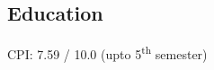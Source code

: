 \documentclass[]{deedy}
\begin{document}
\begin{minipage}[t]{0.25\textwidth}
\begin{flushleft}
\section{Education}
CPI: 7.59 / 10.0 \small{(upto 5\textsuperscript{th} semester)}
\sectionsep
%
\end{flushleft}
\end{minipage}
\hfill
%
\begin{minipage}[t]{0.72\textwidth}
\begin{flushleft}
%

\end{flushleft}
\end{minipage}
\end{document}
